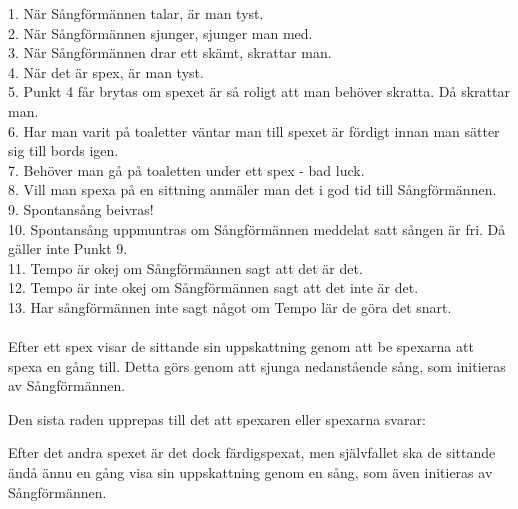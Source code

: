 1. När Sångförmännen talar, är man tyst.\\
2. När Sångförmännen sjunger, sjunger man med.\\
3. När Sångförmännen drar ett skämt, skrattar man.\\
4. När det är spex, är man tyst.\\
5. Punkt 4 får brytas om spexet är så roligt att man behöver skratta. Då skrattar man.\\
6. Har man varit på toaletter väntar man till spexet är fördigt innan man sätter sig till bords igen.\\
7. Behöver man gå på toaletten under ett spex - bad luck.\\
8. Vill man spexa på en sittning anmäler man det i god tid till Sångförmännen.\\
9. Spontansång beivras!\\
10. Spontansång uppmuntras om Sångförmännen meddelat satt sången är fri. Då gäller inte Punkt 9.\\
11. Tempo är okej om Sångförmännen sagt att det är det.\\
12. Tempo är inte okej om Sångförmännen sagt att det inte är det.\\
13. Har sångförmännen inte sagt något om Tempo lär de göra det snart.\\
\\

Efter ett spex visar de sittande sin uppskattning genom att be spexarna att spexa en gång till.
Detta görs genom att sjunga nedanstående sång, som initieras av Sångförmännen.
\\


Den sista raden upprepas till det att spexaren eller spexarna svarar:
\\


Efter det andra spexet är det dock färdigspexat, men självfallet ska de sittande 
ändå ännu en gång visa sin uppskattning genom en sång, som även initieras av Sångförmännen.
\\

